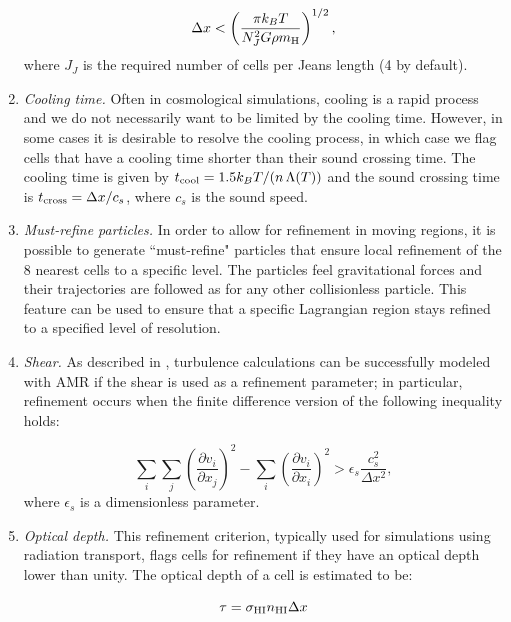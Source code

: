 \begin{enumerate}
\begin{equation}
\Delta x < \left( \frac{\pi k_B T}{N_J^2 G \rho \mh} \right)^{1/2},
\end{equation}
where $J_J$ is the required number of cells per Jeans length (4 by default).

\item{\em Cooling time.}  Often in cosmological simulations, cooling
  is a rapid process and we do not necessarily want to be limited by
  the cooling time.  However, in some cases it is desirable to resolve
  the cooling process, in which case we flag cells that have a cooling
  time shorter than their sound crossing time.  The cooling time is
  given by $t_{\rm cool} = 1.5 k_BT / (n\, \Lambda(T))$ and the sound
  crossing time is $t_{\rm cross} = \Delta x / c_s$, where $c_s$ is
  the sound speed.


\item{\em Must-refine particles.}  In order to allow for refinement in
  moving regions, it is possible to generate ``must-refine" particles
  that ensure local refinement of the 8 nearest cells to a specific
  level.  The particles feel gravitational forces and their
  trajectories are followed as for any other collisionless particle.
  This feature can be used to ensure that a specific Lagrangian region
  stays refined to a specified level of resolution. 


\item{\em Shear.} As described in \citet{Kritsuk06}, turbulence
  calculations can be successfully modeled with AMR if the shear is
  used as a refinement parameter; in particular, refinement occurs
  when the finite difference version of the following inequality
  holds:

\begin{equation}
\sum_i \sum_j \left( \frac{\partial v_i}{\partial x_j} \right)^2 -  \sum_i \left( \frac{\partial v_i}{\partial x_i} \right)^2
> \epsilon_s \frac{c_s^2}{\Delta x^2},
\end{equation}
where $\epsilon_s$ is a dimensionless parameter.

\item{\em Optical depth.} This refinement criterion, typically used
for simulations using radiation transport, flags cells for refinement
if they have an  optical depth lower than unity.  The
optical depth of a cell is estimated to be:

\begin{equation}
\tau = \sigma_{\rm HI} n_{\rm HI} \Delta x 
\end{equation}


\end{enumerate}
